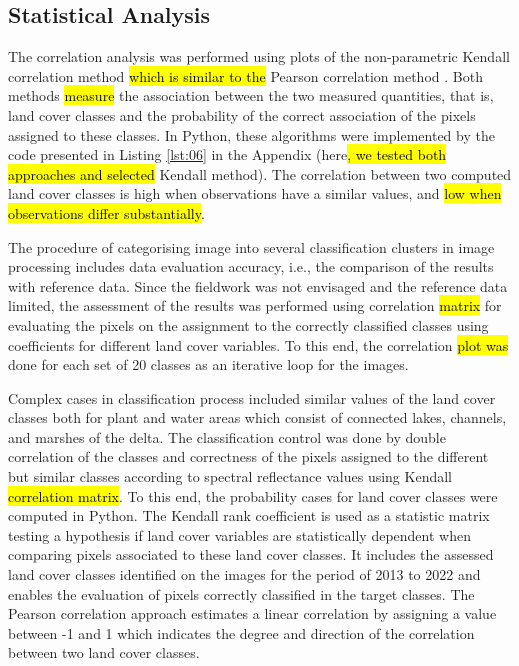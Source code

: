 \documentclass[12pt,a4paper,oneside]{article}
\def \newpar{\vspace{6pt}}
\begin{document}
\subsection*{Statistical Analysis}

\newpar The correlation analysis was performed using plots of the non-parametric Kendall correlation method \citep{Kendall1938} \hl{which is similar to the} Pearson correlation method \citep{Pearson1895}. Both methods \hl{measure} the association between the two measured quantities, that is, land cover classes and the probability of the correct association of the pixels assigned to these classes. In Python, these algorithms were implemented by the code presented in Listing \ref{lst:06} in the Appendix (here\hl{, we tested both approaches and selected} Kendall method). The correlation between two computed land cover classes is high when observations have a similar values, and \hl{low when observations differ substantially}.

\newpar The procedure of categorising image into several classification clusters in image processing includes data evaluation accuracy, i.e., the comparison of the results with reference data. Since the fieldwork was not envisaged and the reference data limited, the assessment of the results was performed using correlation \hl{matrix} for evaluating the pixels on the assignment to the correctly classified classes using coefficients for different land cover variables. To this end, the correlation \hl{plot was} done for each set of 20 classes as an iterative loop for the images.

\newpar Complex cases in classification process included similar values of the land cover classes both for plant and water areas which consist of connected lakes, channels, and marshes of the delta. The classification control was done by double correlation of the classes and correctness of the pixels assigned to the different but similar classes according to spectral reflectance values using Kendall \hl{correlation matrix}. To this end, the probability cases for land cover classes were computed in Python. The Kendall rank coefficient is used as a statistic matrix testing a hypothesis if land cover variables are statistically dependent when comparing pixels associated to these land cover classes. It includes the assessed land cover classes identified on the images for the period of 2013 to 2022 and enables the evaluation of pixels correctly classified in the target classes. The Pearson correlation approach estimates a linear correlation by assigning a value between -1 and 1 which indicates the degree and direction of the correlation between two land cover classes.
\end{document}
